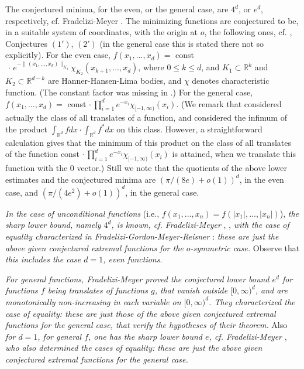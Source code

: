 \documentclass[12pt]{article}
\begin{document}
The conjectured minima, for the even, or the general case, are  
$4^d$, or $e^d$, respectively, 
cf. Fradelizi-Meyer \cite{FM08b}. The minimizing functions
are conjectured to be, in a suitable system of coordinates, with the
origin at $o$, 
the following ones, cf. \cite{FM08b}, Conjectures $(1')$, $(2')$ (in the
general case this is stated there not so explicitly).
For the even case, 
$f(x_1,...,x_d)=$ const$\,\cdot \,e^{-\| (x_1,...,x_k) \| _{K_1}} 
\chi _{K_2} (x_{k+1},...,x_d)$, where $0 \le k
\le d$, and $K_1
\subset {\mathbb R}^k$ and $K_2 \subset {\mathbb R}^{d-k}$ are 
Hanner-Hansen-Lima
bodies, and $\chi $ denotes characteristic function. (The constant factor was
missing in \cite{FM08b}.)
For the general case, 
$f(x_1,...,x_d)=$ const$\,\cdot \prod _{i=1} ^d e^{-x_i} \chi _{[-1, \infty )}
(x_i)$. 
(We remark that \cite{FM08b} considered actually the class of all
translates of a function, and considered the infimum of the product
$\int _{{\mathbb R}^d} fdx \cdot \int _{{\mathbb R}^d} f^*dx$ on this class.
However, a straightforward calculation gives that the minimum of this product
on the class of all translates of the function
const$\,\cdot \prod _{i=1} ^d e^{-x_i} \chi _{[-1, \infty )}
(x_i)$
is attained, when we translate this function with the $0$ vector.)
Still we note that the quotients of the above lower
estimates and the conjectured
minima are $\left( \pi / (8e) +o(1) \right) ^d$, in the even case, and
$\left( \pi / (4e^2)+o(1) \right) ^d$, in the general case.

{\it{In the case of unconditional 
functions}} (i.e., $f(x_1,...,x_n)=f(|x_1|,...,|x_n|)$), 
{\it{the sharp lower bound, namely $4^d$, is known, cf. Fradelizi-Meyer}} 
\cite{FM08a}, \cite{FM08b}, {\it{with
the case of equality characterized in Fradelizi-Gordon-Meyer-Reisner}}
\cite{FGMR}: {\it{these are just the above given conjectured extremal
functions for the $o$-symmetric case.}}
Observe that {\it{this includes the case $d=1$, even functions}}.

{\it{For general functions, Fradelizi-Meyer}} \cite{FM08b} {\it{proved the
conjectured lower bound $e^d$ 
for functions $f$ being translates of functions $g$, that
vanish outside $[0, \infty )^d$, and are monotonically non-increasing in
each variable on $[0, \infty )^d$. 
They characterized the case of equality: these are just those of 
the above given
conjectured extremal functions for the general case, that verify the
hypotheses of their theorem.}}
Also {\it{for $d=1$, for general $f$, one has the sharp lower bound $e$,
cf. Fradelizi-Meyer}} \cite{FM08b}, {\it{who 
also determined the cases of equality: these are just the above given
conjectured extremal functions for the general case.}}
\end{document}
